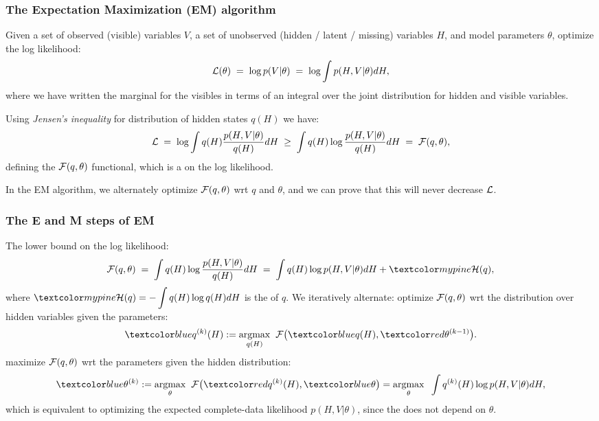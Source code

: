 \begin{frame}
\frametitle{The Expectation Maximization (EM) algorithm}

Given a set of observed (visible) variables $V$, a set of unobserved
(hidden / latent / missing) variables $H$, and model parameters
$\theta$, optimize the log likelihood:
%
\begin{equation}
{\cal L}(\theta)\;=\;\log p(V|\theta)\;=\;\log \int p(H,V|\theta)dH,
\end{equation}
%
where we have written the marginal for the visibles in terms of an
integral over the joint distribution for hidden and visible variables.

Using \emph{Jensen's inequality} for  distribution of hidden
states $q(H)$ we have:
%
\begin{equation}
{\cal L}\;=\;\log\int q(H)\frac{p(H,V|\theta)}{q(H)}dH
\;\geq\;\int q(H)\log\frac{p(H,V|\theta)}{q(H)}dH\;=\;{\cal F}(q,\theta),
\end{equation}
%
defining the ${\cal F}(q,\theta)$ functional, which is a 
on the log likelihood.

In the EM algorithm, we alternately optimize ${\cal F}(q,\theta)$ wrt
$q$ and $\theta$, and we can prove that this will never decrease
${\cal L}$.
\end{frame}

\begin{frame}
\frametitle{The E and M steps of EM}

The lower bound on the log likelihood:
%
\begin{equation}
{\cal F}(q,\theta)\;=\;\int q(H)\log\frac{p(H,V|\theta)}{q(H)}dH\;=\;
\int q(H)\log p(H,V|\theta)dH+\Green{{\cal H}(q)},
\end{equation}
%
where $\Green{{\cal H}(q)=-\displaystyle\int q(H)\log q(H)dH}$ is the
 of $q$. We iteratively alternate:
%
 optimize ${\cal F}(q,\theta)$ wrt the distribution over hidden
variables given the parameters:
\begin{equation}
\Blue{q^{(k)}(H)}:=\underset{q(H)}{\argmax}\;\;{\cal F}\big(\Blue{q(H)},\Red{\theta^{(k-1)}}\big).
\end{equation}
 maximize ${\cal F}(q,\theta)$ wrt the parameters given
the hidden distribution:
\begin{equation}
\Blue{\theta^{(k)}}:=\underset{\theta}{\argmax}\;\;
{\cal F}\big(\Red{q^{(k)}(H)},\Blue{\theta}\big)=
\underset{\theta}{\argmax}\;\;\int q^{(k)}(H)\log p(H,V|\theta)dH,
\end{equation}
which is equivalent to optimizing the expected complete-data likelihood
$p(H,V|\theta)$, since the  does not depend on
$\theta$.
\end{frame}

